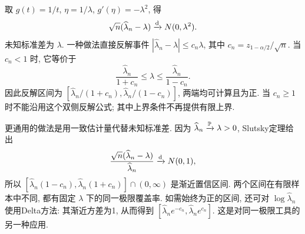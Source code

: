 取 $g(t)=1/t$, $\eta=1/\lambda$, $g'(\eta)=-\lambda^2$, 得
\[
 \sqrt n(\widehat\lambda_n-\lambda)\xrightarrow{\mathrm d} N(0,\lambda^2).
\]
未知标准差为 $\lambda$. 一种做法直接反解事件
$|\widehat\lambda_n-\lambda|\le c_n\lambda$, 其中 $c_n=z_{1-\alpha/2}/\sqrt n$. 当 $c_n<1$ 时, 它等价于
\[
 \frac{\widehat\lambda_n}{1+c_n}\le\lambda\le
 \frac{\widehat\lambda_n}{1-c_n}.
\]
因此反解区间为 $[\widehat\lambda_n/(1+c_n),\widehat\lambda_n/(1-c_n)]$, 两端均可计算且为正. 当 $c_n\ge1$ 时不能沿用这个双侧反解公式; 其中上界条件不再提供有限上界.

更通用的做法是用一致估计量代替未知标准差. 因为 $\widehat\lambda_n\xrightarrow{\mathbb P}\lambda>0$, Slutsky定理给出
\[
 \frac{\sqrt n(\widehat\lambda_n-\lambda)}{\widehat\lambda_n}\xrightarrow{\mathrm d} N(0,1),
\]
所以 $[\widehat\lambda_n(1-c_n),\widehat\lambda_n(1+c_n)]\cap(0,\infty)$ 是渐近置信区间. 两个区间在有限样本中不同, 都有固定 $\lambda$ 下的同一极限覆盖率. 如需始终为正的区间, 还可对 $\log\widehat\lambda_n$ 使用Delta方法: 其渐近方差为1, 从而得到 $[\widehat\lambda_ne^{-c_n},\widehat\lambda_ne^{c_n}]$. 这是对同一极限工具的另一种应用.
